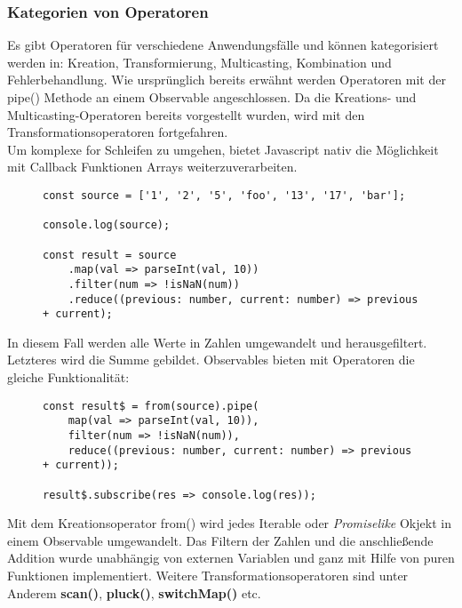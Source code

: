\subsubsection{Kategorien von Operatoren}

Es gibt Operatoren für verschiedene Anwendungsfälle und können kategorisiert werden in: Kreation, Transformierung, Multicasting, Kombination und Fehlerbehandlung. Wie ursprünglich bereits erwähnt werden Operatoren mit der pipe() Methode an einem Observable angeschlossen. Da die Kreations- und Multicasting-Operatoren bereits vorgestellt wurden, wird mit den Transformationsoperatoren fortgefahren.\\

\noindent
Um komplexe for Schleifen zu umgehen, bietet Javascript nativ die Möglichkeit mit Callback Funktionen Arrays weiterzuverarbeiten.

\begin{figure}[H]
\begin{lstlisting}[basicstyle=\small]
const source = ['1', '2', '5', 'foo', '13', '17', 'bar'];

console.log(source);

const result = source
    .map(val => parseInt(val, 10))
    .filter(num => !isNaN(num))
    .reduce((previous: number, current: number) => previous + current);
\end{lstlisting}
\end{figure}

\noindent
In diesem Fall werden alle Werte in Zahlen umgewandelt und herausgefiltert. Letzteres wird die Summe gebildet. Observables bieten mit Operatoren die gleiche Funktionalität:

\begin{figure}[H]
\begin{lstlisting}[basicstyle=\small]
const result$ = from(source).pipe(
    map(val => parseInt(val, 10)),
    filter(num => !isNaN(num)),
    reduce((previous: number, current: number) => previous + current));

result$.subscribe(res => console.log(res));
\end{lstlisting}
\end{figure}

\noindent
Mit dem Kreationsoperator from() wird jedes Iterable oder \textit{Promiselike} Okjekt in einem Observable umgewandelt. Das Filtern der Zahlen und die anschließende Addition wurde unabhängig von externen Variablen und ganz mit Hilfe von puren Funktionen implementiert. Weitere Transformationsoperatoren sind unter Anderem \textbf{scan()}, \textbf{pluck()}, \textbf{switchMap()} etc.\\


